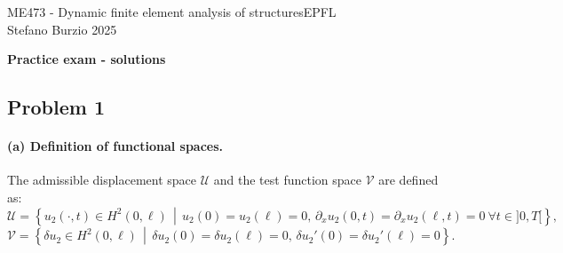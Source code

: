 \documentclass[12pt]{article}
\begin{document}
\noindent ME473 - Dynamic finite element analysis of structures\hfill EPFL\\
Stefano Burzio \hfill 2025\\
\vspace{0.3cm}

\hspace*{\fill}\textbf{\Large Practice exam - solutions}\hspace*{\fill}

\hrulefill

\subsection*{Problem 1}
\paragraph*{(a) Definition of functional spaces.} The admissible displacement space \( \mathcal{U} \) and the test function space \( \mathcal{V} \) are defined as:
\[
	\mathcal{U} = \left\{ u_2(\cdot,t) \in H^2(0,\ell) \,\middle|\, u_2(0)=u_2(\ell)=0,\, \partial_xu_2(0,t)=\partial_xu_2(\ell,t)=0\ \forall t\in]0,T[ \right\},
\]
\[
	\mathcal{V} = \left\{ \delta u_2 \in H^2(0,\ell) \,\middle|\, \delta u_2(0)=\delta u_2(\ell)=0,\, \delta u_2'(0)=\delta u_2'(\ell)=0 \right\}.
\]
\end{document}
